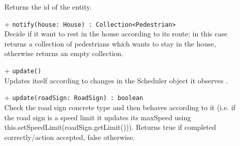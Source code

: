 \begin{itemize}
\begin{itemize}
Returns the id of the entity. 
    \item[+] \texttt{notify(house: House) : Collection<Pedestrian>} \\
Decide if it want to rest in the house according to its route: in this case
returns a collection of pedestrians which wants to stay in the house, otherwise returns
an empty collection. 
    \item[+] \texttt{update()} \\
Updates itself according to changes in the Scheduler object it observes .
    \item[+] \texttt{update(roadSign: RoadSign) : boolean} \\
Check the road sign concrete type and then behaves according to it (i.e. if the
road sign is a speed limit it updates its maxSpeed using this.setSpeedLimit(roadSign.getLimit())). Returns true if completed correctly/action accepted, false otherwise.
  \end{itemize}
\end{itemize}
